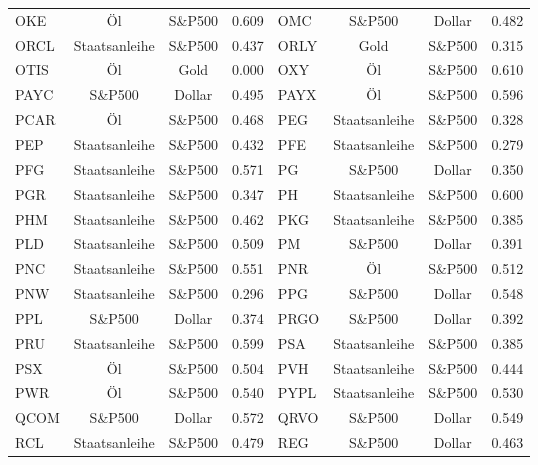 \begin{longtable}{l c c c | l c c c}
    OKE    & Öl            & S\&P500   & 0.609         & OMC    & S\&P500       & Dollar    & 0.482         \\
    ORCL   & Staatsanleihe & S\&P500   & 0.437         & ORLY   & Gold          & S\&P500   & 0.315         \\
    OTIS   & Öl            & Gold      & 0.000         & OXY    & Öl            & S\&P500   & 0.610         \\
    PAYC   & S\&P500       & Dollar    & 0.495         & PAYX   & Öl            & S\&P500   & 0.596         \\
    PCAR   & Öl            & S\&P500   & 0.468         & PEG    & Staatsanleihe & S\&P500   & 0.328         \\
    PEP    & Staatsanleihe & S\&P500   & 0.432         & PFE    & Staatsanleihe & S\&P500   & 0.279         \\
    PFG    & Staatsanleihe & S\&P500   & 0.571         & PG     & S\&P500       & Dollar    & 0.350         \\
    PGR    & Staatsanleihe & S\&P500   & 0.347         & PH     & Staatsanleihe & S\&P500   & 0.600         \\
    PHM    & Staatsanleihe & S\&P500   & 0.462         & PKG    & Staatsanleihe & S\&P500   & 0.385         \\
    PLD    & Staatsanleihe & S\&P500   & 0.509         & PM     & S\&P500       & Dollar    & 0.391         \\
    PNC    & Staatsanleihe & S\&P500   & 0.551         & PNR    & Öl            & S\&P500   & 0.512         \\
    PNW    & Staatsanleihe & S\&P500   & 0.296         & PPG    & S\&P500       & Dollar    & 0.548         \\
    PPL    & S\&P500       & Dollar    & 0.374         & PRGO   & S\&P500       & Dollar    & 0.392         \\
    PRU    & Staatsanleihe & S\&P500   & 0.599         & PSA    & Staatsanleihe & S\&P500   & 0.385         \\
    PSX    & Öl            & S\&P500   & 0.504         & PVH    & Staatsanleihe & S\&P500   & 0.444         \\
    PWR    & Öl            & S\&P500   & 0.540         & PYPL   & Staatsanleihe & S\&P500   & 0.530         \\
    QCOM   & S\&P500       & Dollar    & 0.572         & QRVO   & S\&P500       & Dollar    & 0.549         \\
    RCL    & Staatsanleihe & S\&P500   & 0.479         & REG    & S\&P500       & Dollar    & 0.463         \\

\end{longtable}
